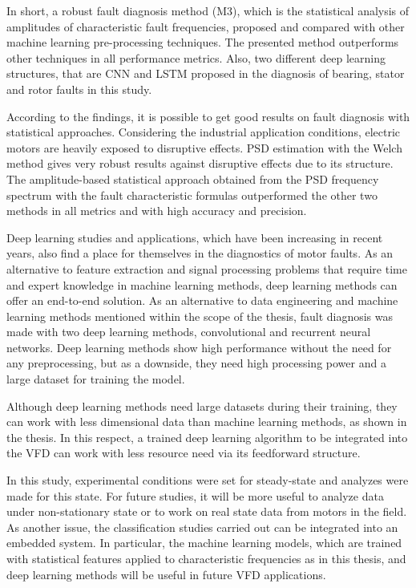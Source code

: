 In short, a robust fault diagnosis method (M3), which is the statistical analysis of amplitudes of characteristic fault frequencies, proposed and compared with other machine learning pre-processing techniques. The presented method outperforms other techniques in all performance metrics. Also, two different deep learning structures,  that are CNN and LSTM proposed in the diagnosis of bearing, stator and rotor faults in this study.

According to the findings, it is possible to get good results on fault diagnosis with statistical approaches. Considering the industrial application conditions,  electric motors are heavily exposed to disruptive effects. PSD estimation with the Welch method gives very robust results against disruptive effects due to its structure. The amplitude-based statistical approach obtained from the PSD frequency spectrum with the fault characteristic formulas outperformed the other two methods in all metrics and with high accuracy and precision.

Deep learning studies and applications, which have been increasing in recent years, also find a place for themselves in the diagnostics of motor faults. As an alternative to feature extraction and signal processing problems that require time and expert knowledge in machine learning methods, deep learning methods can offer an end-to-end solution. As an alternative to data engineering and machine learning methods mentioned within the scope of the thesis, fault diagnosis was made with two deep learning methods, convolutional and recurrent neural networks. Deep learning methods show high performance without the need for any preprocessing, but as a downside, they need high processing power and a large dataset for training the model.

Although deep learning methods need large datasets during their training, they can work with less dimensional data than machine learning methods, as shown in the thesis. In this respect, a trained deep learning algorithm to be integrated into the VFD can work with less resource need via its feedforward structure.

In this study, experimental conditions were set for steady-state and analyzes were made for this state. For future studies, it will be more useful to analyze data under non-stationary state or to work on real state data from motors in the field. As another issue, the classification studies carried out can be integrated into an embedded system. In particular, the machine learning models, which are trained with statistical features applied to characteristic frequencies as in this thesis, and deep learning methods will be useful in future VFD applications.

